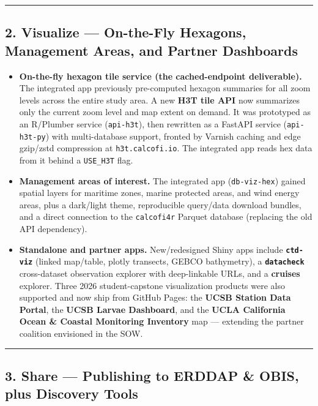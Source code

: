 \documentclass[
  letterpaper,
  DIV=11,
  numbers=noendperiod]{scrreprt}
\begin{document}
\begin{center}\rule{0.5\linewidth}{0.5pt}\end{center}

\subsection{2. Visualize --- On-the-Fly Hexagons, Management Areas, and
Partner
Dashboards}\label{visualize-on-the-fly-hexagons-management-areas-and-partner-dashboards}

\begin{itemize}
\item
  \textbf{On-the-fly hexagon tile service (the cached-endpoint
  deliverable).} The integrated app previously pre-computed hexagon
  summaries for all zoom levels across the entire study area. A new
  \textbf{H3T tile API} now summarizes only the current zoom level and
  map extent on demand. It was prototyped as an R/Plumber service
  (\texttt{api-h3t}), then rewritten as a FastAPI service
  (\texttt{api-h3t-py}) with multi-database support, fronted by Varnish
  caching and edge gzip/zstd compression at \texttt{h3t.calcofi.io}. The
  integrated app reads hex data from it behind a \texttt{USE\_H3T} flag.
\item
  \textbf{Management areas of interest.} The integrated app
  (\texttt{db-viz-hex}) gained spatial layers for maritime zones, marine
  protected areas, and wind energy areas, plus a dark/light theme,
  reproducible query/data download bundles, and a direct connection to
  the \texttt{calcofi4r} Parquet database (replacing the old API
  dependency).
\item
  \textbf{Standalone and partner apps.} New/redesigned Shiny apps
  include \textbf{\texttt{ctd-viz}} (linked map/table, plotly transects,
  GEBCO bathymetry), a \textbf{\texttt{datacheck}} cross-dataset
  observation explorer with deep-linkable URLs, and a \textbf{cruises}
  explorer. Three 2026 student-capstone visualization products were also
  supported and now ship from GitHub Pages: the \textbf{UCSB Station
  Data Portal}, the \textbf{UCSB Larvae Dashboard}, and the \textbf{UCLA
  California Ocean \& Coastal Monitoring Inventory} map --- extending
  the partner coalition envisioned in the SOW.
\end{itemize}

\begin{center}\rule{0.5\linewidth}{0.5pt}\end{center}

\subsection{3. Share --- Publishing to ERDDAP \& OBIS, plus Discovery
Tools}\label{share-publishing-to-erddap-obis-plus-discovery-tools}
\end{document}
